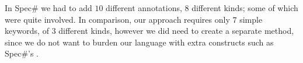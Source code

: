 In Spec\# we had to add $10$ different annotations,  $8$ different kinds; some of which were quite involved. In comparison, our approach requires only $7$ simple keywords, of $3$ different kinds, however we did need to create a separate \Q@moveTo@ method, since we do not want to burden our language with extra constructs such as Spec\#'s \Q@expose@.

%

